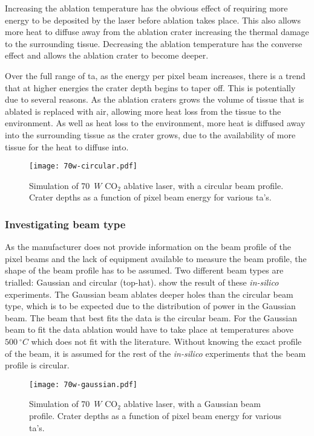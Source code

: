 Increasing the ablation temperature has the obvious effect of requiring more energy to be deposited by the laser before ablation takes place. This also allows more heat to diffuse away from the ablation crater increasing the thermal damage to the surrounding tissue. Decreasing the ablation temperature has the converse effect and allows the ablation crater to become deeper.

Over the full range of \gls*{ta}, as the energy per pixel beam increases, there is a trend that at higher energies the crater depth begins to taper off. This is potentially due to several reasons. As the ablation craters grows the volume of tissue that is ablated is replaced with air, allowing more heat loss from the tissue to the environment. As well as heat loss to the environment, more heat is diffused away into the surrounding tissue as the crater grows, due to the availability of more tissue for the heat to diffuse into.


\begin{figure}[!htbp]
	\centering
    \texttt{[image: 70w-circular.pdf]}
    \caption{Simulation of 70~$W$ CO$_2$ ablative laser, with a circular beam profile. Crater depths as a function of pixel beam energy for various \gls*{ta}'s.}
    \label{fig:tacirc}
\end{figure}
 


\subsubsection*{Investigating beam type}

As the manufacturer does not provide information on the beam profile of the pixel beams and the lack of equipment available to measure the beam profile, the shape of the beam profile has to be assumed. Two different beam types are trialled: Gaussian and circular (top-hat).  show the result of these \textit{in-silico} experiments. The Gaussian beam ablates deeper holes than the circular beam type, which is to be expected due to the distribution of power in the Gaussian beam. The beam that best fits the data is the circular beam. For the Gaussian beam to fit the data ablation would have to take place at temperatures above $500~^{\circ}C$ which does not fit with the literature. Without knowing the exact profile of the beam, it is assumed for the rest of the \textit{in-silico} experiments that the beam profile is circular.

 \begin{figure}[!htbp]
	\centering
    \texttt{[image: 70w-gaussian.pdf]}
    \caption{Simulation of 70~$W$ CO$_2$ ablative laser, with a Gaussian beam profile. Crater depths as a function of pixel beam energy for various \gls*{ta}'s.}
    \label{fig:tagauss}
\end{figure}

